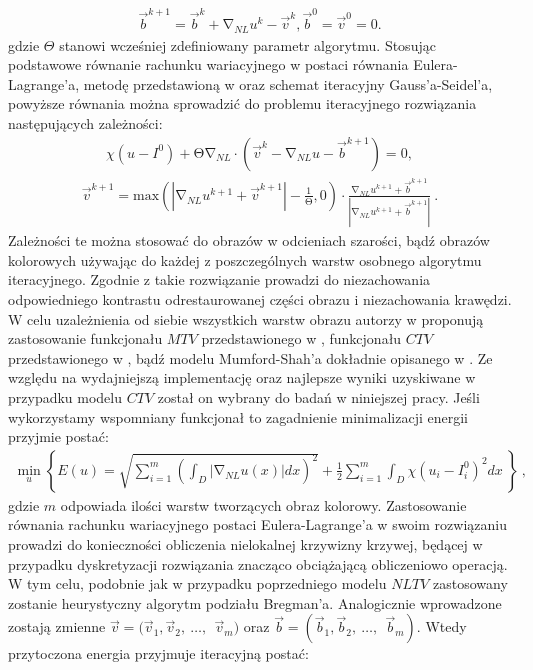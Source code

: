 \documentclass[12pt, twoside, openany]{report}
\theoremstyle{definition}
\begin{document}
\begin{align}
{\overrightarrow{b}}^{k+1}={\overrightarrow{b}}^k+{\mathrm{\nabla }}_{NL}u^k-{\overrightarrow{v}}^k, {\overrightarrow{b}}^0={\overrightarrow{v}}^0=0.
\label{BREGMANVARIABLE}
\end{align}
gdzie $\Theta$ stanowi wcześniej zdefiniowany parametr algorytmu. Stosując podstawowe równanie rachunku wariacyjnego w postaci równania Eulera-Lagrange’a, metodę przedstawioną w \cite{tai2011fast} oraz schemat iteracyjny Gauss’a-Seidel’a, powyższe równania można sprowadzić do problemu iteracyjnego rozwiązania następujących zależności:
\begin{align}
\chi \left(u-I^0\right)+\mathrm{\Theta }{\mathrm{\nabla }}_{NL}\cdot \left({\overrightarrow{v}}^k-{\mathrm{\nabla }}_{NL}u-{\overrightarrow{b}}^{k+1}\right)=0,
\label{ELNLTV1}
\end{align}
\begin{align}
{\overrightarrow{v}}^{k+1}\mathrm{=}{\mathrm{max} \left(\left|{\mathrm{\nabla }}_{NL}u^{k+1}+{\overrightarrow{v}}^{k+1}\right|-\frac{1}{\mathrm{\Theta }},0\right)\cdot\frac{{\mathrm{\nabla }}_{NL}u^{k+1}+{\overrightarrow{b}}^{k+1}}{\left|{\mathrm{\nabla }}_{NL}u^{k+1}+{\overrightarrow{b}}^{k+1}\right|}\ }.
\label{ELNLTV2}
\end{align}
Zależności te można stosować do obrazów w odcieniach szarości, bądź obrazów kolorowych używając do  każdej z poszczególnych warstw osobnego algorytmu iteracyjnego. Zgodnie z \cite{duan2015fast} takie rozwiązanie prowadzi do niezachowania odpowiedniego kontrastu odrestaurowanej części obrazu i niezachowania krawędzi.
W celu uzależnienia od siebie wszystkich warstw obrazu autorzy w \cite{duan2015fast} proponują zastosowanie funkcjonału $MTV$ przedstawionego w \cite{yang2009fast}, funkcjonału $CTV$ przedstawionego w \cite{blomgren1998color}, bądź modelu Mumford-Shah’a dokładnie opisanego w \cite{jung2011nonlocal}. Ze względu na wydajniejszą implementację oraz najlepsze wyniki uzyskiwane w przypadku modelu \textbf{$CTV$} został on wybrany do badań w niniejszej pracy. Jeśli wykorzystamy wspomniany funkcjonał to zagadnienie minimalizacji energii przyjmie postać:
\begin{align}
{\mathop{\mathrm{min}}_{u} \left\{E\left(u\right)=\sqrt{\sum^m_{i=1}{{\left(\int_D{\left|{\mathrm{\nabla }}_{NL}u(x)\right|}dx\right)}^2}}+\frac{1}{2}\sum^m_{i=1}{\int_D{\chi{\left(u_i-I^0_i\right)}^2}dx}\ \right\}\ },
\label{ENLCTV}
\end{align}
gdzie $m$ odpowiada ilości warstw tworzących obraz kolorowy. Zastosowanie równania rachunku wariacyjnego postaci Eulera-Lagrange’a w swoim rozwiązaniu prowadzi do konieczności obliczenia nielokalnej krzywizny krzywej, będącej w przypadku dyskretyzacji rozwiązania znacząco obciążającą obliczeniowo operacją. W tym celu, podobnie jak w przypadku poprzedniego modelu $NLTV$ zastosowany zostanie heurystyczny algorytm podziału Bregman’a. Analogicznie wprowadzone zostają zmienne $\overrightarrow{v}=\big({\overrightarrow{v}}_1,{\overrightarrow{v}}_2,\ \dots ,\ \ {\overrightarrow{v}}_m\big)$ oraz $\overrightarrow{b}=\left({\overrightarrow{b}}_1,{\overrightarrow{b}}_2,\ \dots ,\ \ {\overrightarrow{b}}_m\right)$. Wtedy przytoczona energia przyjmuje iteracyjną postać:
\end{document}
